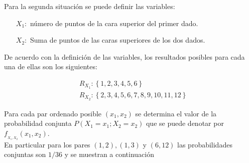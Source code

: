\documentclass[base=hide,12pt]{elegantbook}
\begin{document}
Para la segunda situación se puede  definir las variables:\\
\begin{itemize}
	\item[$X_1:$] número de puntos de la cara superior del primer dado.
	\item[$X_2:$] Suma de puntos de las caras superiores de los dos dados.
\end{itemize}
De acuerdo con la definición de las variables, los resultados posibles para cada una de ellas son los siguientes:

\begin{align*}
	&R_{X_{1}}:\left\{1,2,3,4,5,6\right\}\\
	&R_{X_{2}}:\left\{2,3,4,5,6,7,8,9,10,11,12\right\}
\end{align*}
	
Para cada par ordenado posible $(x_1,x_2)$ se determina el valor de la probabilidad conjunta $P(X_1=x_1 ; X_2=x_2)$ que se puede denotar por $f_{_{X_1,X_2}}(x_1,x_2)$.\\

En particular para los pares $(1,2),(1,3)$ y $(6,12)$ las probabilidades conjuntas son $1/36$ y se muestran a continuación
\end{document}

